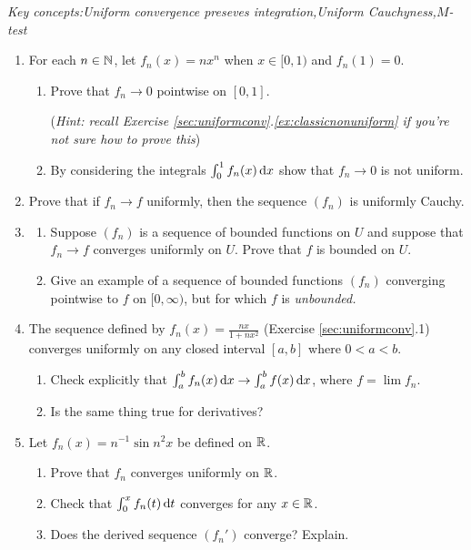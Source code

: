 \begin{exercises}
	\emph{Key concepts:\quad Uniform convergence preseves integration,\quad Uniform Cauchyness,\quad $M$-test}

	\begin{enumerate}
		\item For each $n\in\mathbb{N}$, let $f_n(x)=nx^n$ when $x\in[0,1)$ and $f_n(1)=0$.
		\begin{enumerate}
	    \item Prove that $f_n\to 0$ pointwise on $[0,1]$.\par
	    (\emph{Hint: recall Exercise \ref*{sec:uniformconv}.\ref{ex:classicnonuniform} if you're not sure how to prove this})
	    \item By considering the integrals $\int_0^1f_n(x)\,{\mathrm{d} x}$ show that $f_n\to 0$ is not uniform.
	  \end{enumerate}
	  
	  
	  \item\label{ex:cauchyexproof} Prove that if $f_n\to f$ uniformly, then the sequence $(f_n)$ is uniformly Cauchy.
	  
	  
	  \item\begin{enumerate}
	    \item Suppose $(f_n)$ is a sequence of bounded functions on $U$ and suppose that $f_n\to f$ converges uniformly on $U$. Prove that $f$ is bounded on $U$.
	    \item Give an example of a sequence of bounded functions $(f_n)$ converging pointwise to $f$ on $[0,\infty)$, but for which $f$ is \emph{unbounded.}
	  \end{enumerate}
	  
	  
	  \item The sequence defined by $f_n(x)=\frac{nx}{1+nx^2}$ (Exercise \ref{sec:uniformconv}.1) converges uniformly on any closed interval $[a,b]$ where $0<a<b$.
	  \begin{enumerate}
	    \item Check explicitly that $\int_a^b f_n(x)\,{\mathrm{d} x}\to \int_a^bf(x)\,{\mathrm{d} x}$, where $f=\lim f_n$.
	    \item Is the same thing true for derivatives?
	  \end{enumerate}
	  
	 	\item Let $f_n(x)=n^{-1}\sin n^2x$ be defined on $\mathbb{R}$.
	 	\begin{enumerate}
	 	  \item Prove that $f_n$ converges uniformly on $\mathbb{R}$.
	 	  \item Check that $\int_0^x f_n(t)\,{\mathrm{d} t}$ converges for any $x\in\mathbb{R}$.
	 	  \item Does the derived sequence $(f_n')$ converge? Explain.
	 	\end{enumerate}
	  

\end{enumerate}
\end{exercises}
